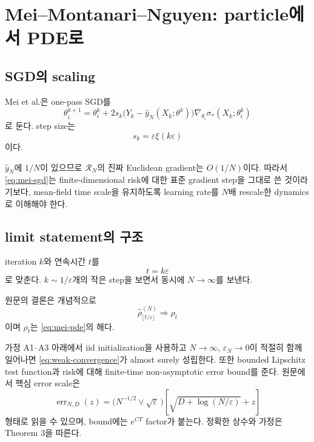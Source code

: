 \documentclass[11pt,a4paper,oneside,openany]{memoir}
\newcommand{\Risk}{\mathcal{R}}
\newcommand{\grad}{\nabla}
\theoremstyle{definition}
\begin{document}
\chapter{Mei--Montanari--Nguyen: particle에서 PDE로}

\section{SGD의 scaling}

Mei et al.은 one-pass SGD를
\begin{equation}
  \theta_i^{k+1}
  =\theta_i^k
  +2s_k\bigl(Y_k-\hat y_N(X_k;\theta^k)\bigr)
  \grad_{\theta_i}\sigma_*(X_k;\theta_i^k)
\label{eq:mei-sgd}
\end{equation}
로 둔다. step size는
\[
  s_k=\varepsilon\xi(k\varepsilon)
\]
이다.

$\hat y_N$에 $1/N$이 있으므로 $\Risk_N$의 진짜 Euclidean gradient는 $O(1/N)$이다.
따라서 \eqref{eq:mei-sgd}는 finite-dimensional risk에 대한 표준 gradient step을 그대로 쓴 것이라기보다,
mean-field time scale을 유지하도록 learning rate를 $N$배 rescale한 dynamics로 이해해야 한다.

\section{limit statement의 구조}

iteration $k$와 연속시간 $t$를
\[
  t=k\varepsilon
\]
로 맞춘다. $k\sim1/\varepsilon$개의 작은 step을 보면서 동시에 $N\to\infty$를 보낸다.

원문의 결론은 개념적으로
\begin{equation}
  \hat\rho^{(N)}_{\lfloor t/\varepsilon\rfloor}
  \Longrightarrow \rho_t
\label{eq:weak-convergence}
\end{equation}
이며 $\rho_t$는 \eqref{eq:mei-pde}의 해다.

\begin{paperbox}
가정 A1--A3 아래에서 iid initialization을 사용하고
$N\to\infty$, $\varepsilon_N\to0$이 적절히 함께 일어나면
\eqref{eq:weak-convergence}가 almost surely 성립한다.
또한 bounded Lipschitz test function과 risk에 대해 finite-time non-asymptotic error bound를 준다.
원문에서 핵심 error scale은
\[
\operatorname{err}_{N,D}(z)
=\bigl(N^{-1/2}\vee\sqrt{\varepsilon}\,\bigr)
\left[\sqrt{D+\log(N/\varepsilon)}+z\right]
\]
형태로 읽을 수 있으며, bound에는 $e^{CT}$ factor가 붙는다. 정확한 상수와 가정은 Theorem 3을 따른다.
\end{paperbox}
\end{document}
